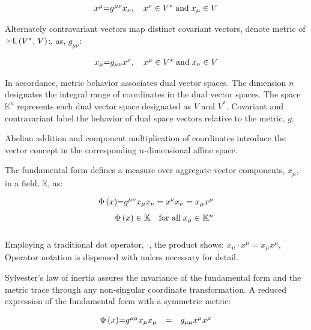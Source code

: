 \documentclass[aps,twocolumn,secnumarabic,nobalancelastpage,amsmath,amssymb,
amsthm,nofootinbib,parskip=full]{revtex4}
\numberwithin{equation}{section}
\newcommand{\lmetric}[2]{\ppv{g}{\mathsf{L}}\pa{#1,\,#2}}
\newcommand{\ppv}[2]{{\,\raisebox{2pt}{\scalebox{.5}{(#1)\,}}}#2}
\newcommand{\pa}[1]{\left(#1\right)}
\begin{document}
\begin{equation*}
\begin{array}{rcl}
x^\mu$=$g^{\mu\nu} x_\nu,\quad x^\nu\in V^*\;\text{and}\;x_\mu\in V
\end{array}
\end{equation*}

Alternately contravariant vectors map distinct covariant vectors,
denote metric of $\lmetric{V^*}{V}$:, as, $g_{\mu\nu}$:

\begin{equation*}
\begin{array}{rcl}
x_\mu$=$g_{\mu\nu} x^\nu,\quad x^\mu\in V^*\;\text{and}\;x_\nu\in V
\end{array}
\end{equation*}

In accordance, metric behavior associates dual vector spaces.
The dimension $n$ designates the integral range of coordinates in the
dual vector spaces. The space $\mathbb{K}^n$ represents
each dual vector space designated as $V$ and $V^*$. Covariant and
contravariant label the behavior of dual space vectors
relative to the metric, $g$.

Abelian addition and component multiplication of coordinates introduce the
vector concept in the corresponding $n$-dimensional affine space.

The fundamental form defines a measure over aggregate vector components,
$x_\mu$, in a field, $\mathbb{K}$, as:

\begin{equation*}
\begin{array}{rcl}
\Phi\pa{x}$=$g^{\mu\nu}x_\mu x_\nu=x^\nu x_\nu=x_\mu x^\mu \\[7pt]
\Phi\pa{x}\in\mathbb{K}\quad\text{for all}\;x_\mu\in\mathbb{K}^n \\[7pt] 
\end{array}
\end{equation*}

Employing a traditional dot operator, $\cdot$, the product shows:
$x_\mu\cdot x^\mu=x_\mu x^\mu$, Operator notation is dispensed with
unless necessary for detail.

Sylvester's law of inertia assures the invariance of the fundamental form
and the metric trace through any non-singular coordinate transformation.
A reduced expression of the fundamental form with a symmetric metric:

\begin{equation*}
\begin{array}{rcl}
\Phi\pa{x}$=$g^{\mu\mu} x_\mu x_\mu&=&g_{\mu\mu} x^\mu x^\mu
\end{array}
\end{equation*}
\end{document}
